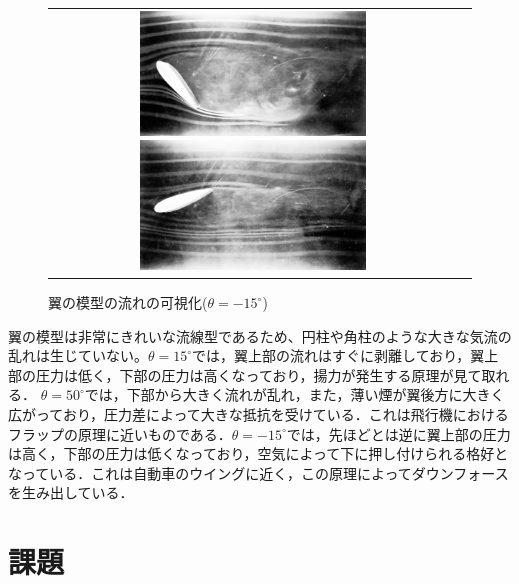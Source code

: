 \documentclass[a4paper,11pt,uplatex]{jsarticle}
\begin{document}
\begin{figure}[H]
  \begin{tabular}{cc}
    \begin{minipage}{0.5\hsize}
      \centering
      \includegraphics[width = 6cm]{pic/009.jpg}
      \caption{翼の模型の流れの可視化($\theta = 50 ^{\circ}$)}
      \label{4_3}
    \end{minipage}

    \begin{minipage}{0.5\hsize}
      \centering
      \includegraphics[width = 6cm]{pic/010.jpg}
      \caption{翼の模型の流れの可視化($\theta = -15 ^{\circ}$)}
      \label{4_4}
    \end{minipage}
  \end{tabular}
\end{figure}

翼の模型は非常にきれいな流線型であるため、円柱や角柱のような大きな気流の乱れは生じていない。$\theta = 15^{\circ}$では，翼上部の流れはすぐに剥離しており，翼上部の圧力は低く，下部の圧力は高くなっており，揚力が発生する原理が見て取れる．
$\theta = 50^{\circ}$では，下部から大きく流れが乱れ，また，薄い煙が翼後方に大きく広がっており，圧力差によって大きな抵抗を受けている．これは飛行機におけるフラップの原理に近いものである．$\theta = -15^{\circ}$では，先ほどとは逆に翼上部の圧力は高く，下部の圧力は低くなっており，空気によって下に押し付けられる格好となっている．これは自動車のウイングに近く，この原理によってダウンフォースを生み出している．

\section{課題}
\end{document}

